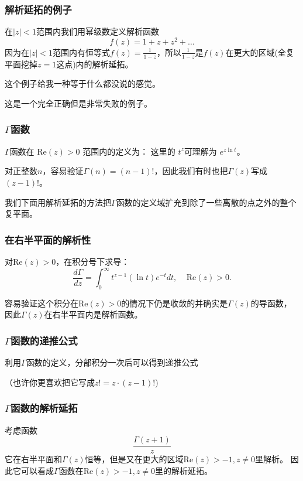 \documentclass[CJK, 13pt]{beamer}
\begin{document}
\begin{frame}
  \frametitle{解析延拓的例子}
  
  在$|z|<1$范围内我们用幂级数定义解析函数
  $$f(z) = 1+z+z^2+\ldots$$
  因为在$|z|<1$范围内有恒等式$f(z) = \frac{1}{1-z}$，所以$\frac{1}{1-z}$是$f(z)$在更大的区域(全复平面挖掉$z=1$这点)内的解析延拓。


  \skiplines
  
  \wulian 这个例子给我一种等于什么都没说的感觉。
  
  \bye 这是一个完全正确但是非常失败的例子。

  
\end{frame}


\begin{frame}
  \frametitle{$\Gamma$函数}
  
  $\Gamma$函数在 $\mathrm{Re}(z) > 0$ 范围内的定义为：
  这里的 $t^z$可理解为 $e^{z\ln t}$。


  \skipline

  对正整数$n$，容易验证$\Gamma(n) = (n-1)!$，因此我们有时也把$\Gamma(z)$写成$(z-1)!$。

  \skiplines
  
  我们下面用解析延拓的方法把$\Gamma$函数的定义域扩充到除了一些离散的点之外的整个复平面。
  
  
\end{frame}


\begin{frame}
  \frametitle{在右半平面的解析性}
  
  对$\mathrm{Re}(z)>0$，在积分号下求导：
  $$\frac{d\Gamma}{dz} = \int_0^\infty t^{z-1} (\ln t) e^{-t}dt,  \ \ \ \ \ \mathrm{Re}(z)>0.$$

  容易验证这个积分在$\mathrm{Re}(z)>0$的情况下仍是收敛的并确实是$\Gamma(z)$的导函数，因此$\Gamma(z)$在右半平面内是解析函数。
  
  
\end{frame}

\begin{frame}
  \frametitle{$\Gamma$函数的递推公式}
  
  利用$\Gamma$函数的定义，分部积分一次后可以得到递推公式

 （也许你更喜欢把它写成$z! = z \cdot (z-1)!$)
  
\end{frame}

\begin{frame}
  \frametitle{$\Gamma$函数的解析延拓}
  
  考虑函数
  $$ \frac{\Gamma(z+1)}{z} $$
  它在右半平面和$\Gamma(z)$恒等，但是又在更大的区域$\mathrm{Re}(z)>-1, z\ne 0$里解析。
  因此它可以看成$\Gamma$函数在$\mathrm{Re}(z)>-1, z\ne 0$里的解析延拓。

  
\end{frame}
\end{document}

